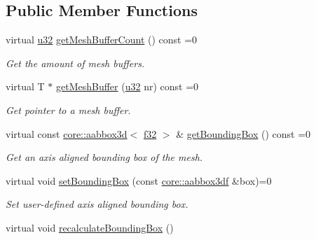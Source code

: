 \subsection*{Public Member Functions}
\begin{DoxyCompactItemize}
\item 
virtual \hyperlink{namespaceirr_a0416a53257075833e7002efd0a18e804}{u32} \hyperlink{classirr_1_1scene_1_1IMesh_ac646156350e42e51bac3ab7951034151}{get\+Mesh\+Buffer\+Count} () const  =0
\begin{DoxyCompactList}\small\item\em Get the amount of mesh buffers. \end{DoxyCompactList}\item 
virtual T $\ast$ \hyperlink{classirr_1_1scene_1_1IMesh_a67a26eef0e99a45ef5aab73dd80a993f}{get\+Mesh\+Buffer} (\hyperlink{namespaceirr_a0416a53257075833e7002efd0a18e804}{u32} nr) const  =0
\begin{DoxyCompactList}\small\item\em Get pointer to a mesh buffer. \end{DoxyCompactList}\item 
virtual const \hyperlink{classirr_1_1core_1_1aabbox3d}{core\+::aabbox3d}$<$ \hyperlink{namespaceirr_a0277be98d67dc26ff93b1a6a1d086b07}{f32} $>$ \& \hyperlink{classirr_1_1scene_1_1IMesh_a821ad4b325444ff5b47035cf54a4303f}{get\+Bounding\+Box} () const  =0
\begin{DoxyCompactList}\small\item\em Get an axis aligned bounding box of the mesh. \end{DoxyCompactList}\item 
virtual void \hyperlink{classirr_1_1scene_1_1IMesh_afe0512c81bf86d2feb16d84bbce72b6d}{set\+Bounding\+Box} (const \hyperlink{namespaceirr_1_1core_adfc8fa01b30044c55f3332a1d6c1aa19}{core\+::aabbox3df} \&box)=0
\begin{DoxyCompactList}\small\item\em Set user-\/defined axis aligned bounding box. \end{DoxyCompactList}\item 
virtual void \hyperlink{classirr_1_1scene_1_1IMesh_a38e6d34862f1d27ba69f6009f8eea9e5}{recalculate\+Bounding\+Box} ()\hypertarget{classirr_1_1scene_1_1IMesh_a38e6d34862f1d27ba69f6009f8eea9e5}{}\label{classirr_1_1scene_1_1IMesh_a38e6d34862f1d27ba69f6009f8eea9e5}


\end{DoxyCompactItemize}

